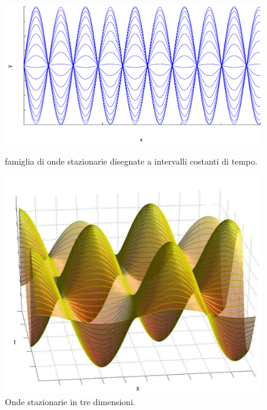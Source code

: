 \begin{figure}[htbp]
   \centering
   \includegraphics[scale=0.5]{immagini/fisica1/stazionarie1}
   \caption{famiglia di onde stazionarie disegnate a intervalli costanti di tempo.}
   \includegraphics[scale=0.7]{immagini/fisica1/stazionarie2}
   \caption{Onde stazionarie in tre dimensioni.}
\end{figure}

